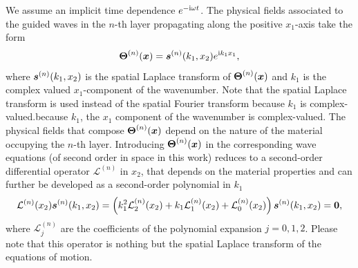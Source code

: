 We assume an implicit time dependence $e^{-\mathrm i \omega t}$. The physical fields associated to the guided waves in the $n$-th layer propagating along the positive $x_1$-axis take the form
    \begin{equation}
         \boldsymbol{\Theta}^{(n)}  (\boldsymbol x) = \boldsymbol s^{(n)}(k_1,x_2) e^{\mathrm i k_1 x_1},
        \label{eq:field_ansatz}
    \end{equation}
where $\boldsymbol s^{(n)}(k_1, x_2)$ is the spatial Laplace transform of $\boldsymbol{\Theta}^{(n)} (\boldsymbol x)$ and $k_1$ is the complex valued $x_1$-component of the wavenumber. Note that the spatial Laplace transform is used instead of the spatial Fourier transform because $k_1$ is complex-valued.because $ k_1$, the $x_1$ component of the wavenumber is complex-valued. The physical fields that compose $\boldsymbol{\Theta}^{(n)}  (\boldsymbol x)$ depend on the nature of the material occupying the $n$-th layer. Introducing $\boldsymbol{\Theta}^{(n)}  (\boldsymbol x)$ in the corresponding wave equations (of second order in space in this work) reduces to a second-order differential operator $\mathcal L^{(n)}$ in $x_2$, that depends on the material properties and can further be developed as a second-order polynomial in $ k_1$
    \begin{equation}
        \mathcal L^{(n)}(x_2) \boldsymbol s^{(n)}(k_1, x_2) = \left( k_1^2\mathcal L_2^{(n)}(x_2) + k_1\mathcal L_1^{(n)}(x_2) + \mathcal L_0^{(n)}(x_2) \right) \boldsymbol s^{(n)}(k_1, x_2) = \boldsymbol 0,
        \label{eq:operator_decomposition}
    \end{equation}
where $\mathcal L^{(n)}_j$ are the coefficients of the polynomial expansion $j=0,1,2$. Please note that this operator is nothing but the spatial Laplace transform of the equations of motion. 
    
